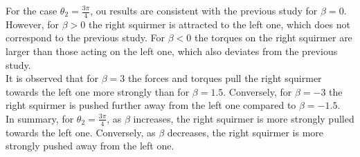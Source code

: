 \documentclass{article}
\begin{document}
For the case $\theta_2 = \frac{3\pi}{4}$, ou results are consistent with the previous study\cite{Stark} for 
$\beta = 0$. However, for $\beta > 0$ the right 
squirmer is attracted to the left one,
 which does not correspond to the previous study. For $\beta < 0$ the torques on the right squirmer are larger than
 those acting on the left one, which also deviates from the previous study.\\
It is observed that for $\beta = 3$ the forces and torques pull the right squirmer towards the left one more strongly than for $\beta=1.5$.
Conversely, for $\beta = -3$ the right squirmer is pushed further away from the left one compared to $\beta = -1.5$.\\
In summary, for $\theta_2 = \frac{3\pi}{4}$, as $\beta$ increases, the right squirmer is more strongly pulled towards the left one. Conversely, as
$\beta$ decreases, the right squirmer is more strongly pushed away from the left one.
\end{document}
